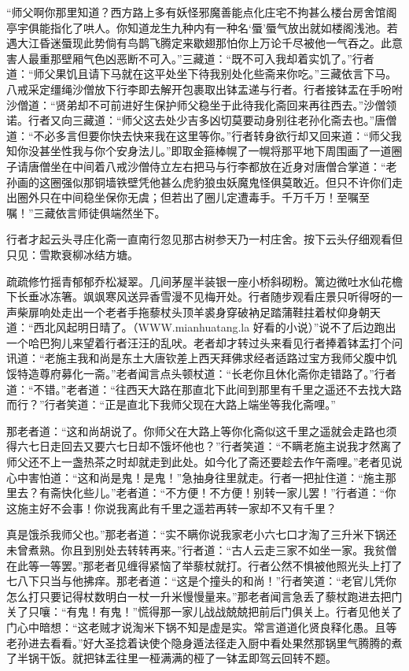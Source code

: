 \documentclass[12pt,UTF8]{ctexbook}
\begin{document}
“师父啊你那里知道？西方路上多有妖怪邪魔善能点化庄宅不拘甚么楼台房舍馆阁亭宇俱能指化了哄人。你知道龙生九种内有一种名‘蜃’蜃气放出就如楼阁浅池。若遇大江昏迷蜃现此势倘有鸟鹊飞腾定来歇翅那怕你上万论千尽被他一气吞之。此意害人最重那壁厢气色凶恶断不可入。”三藏道：“既不可入我却着实饥了。”行者道：“师父果饥且请下马就在这平处坐下待我别处化些斋来你吃。”三藏依言下马。八戒采定缰绳沙僧放下行李即去解开包裹取出钵盂递与行者。行者接钵盂在手吩咐沙僧道：“贤弟却不可前进好生保护师父稳坐于此待我化斋回来再往西去。”沙僧领诺。行者又向三藏道：“师父这去处少吉多凶切莫要动身别往老孙化斋去也。”唐僧道：“不必多言但要你快去快来我在这里等你。”行者转身欲行却又回来道：“师父我知你没甚坐性我与你个安身法儿。”即取金箍棒幌了一幌将那平地下周围画了一道圈子请唐僧坐在中间着八戒沙僧侍立左右把马与行李都放在近身对唐僧合掌道：“老孙画的这圈强似那铜墙铁壁凭他甚么虎豹狼虫妖魔鬼怪俱莫敢近。但只不许你们走出圈外只在中间稳坐保你无虞；但若出了圈儿定遭毒手。千万千万！至嘱至嘱！”三藏依言师徒俱端然坐下。

行者才起云头寻庄化斋一直南行忽见那古树参天乃一村庄舍。按下云头仔细观看但只见：雪欺衰柳冰结方塘。

疏疏修竹摇青郁郁乔松凝翠。几间茅屋半装银一座小桥斜砌粉。篱边微吐水仙花檐下长垂冰冻箸。飒飒寒风送异香雪漫不见梅开处。行者随步观看庄景只听得呀的一声柴扉响处走出一个老者手拖藜杖头顶羊裘身穿破衲足踏蒲鞋拄着杖仰身朝天道：“西北风起明日晴了。（WWW.mianhuatang.la 好看的小说）”说不了后边跑出一个哈巴狗儿来望着行者汪汪的乱吠。老者却才转过头来看见行者捧着钵盂打个问讯道：“老施主我和尚是东土大唐钦差上西天拜佛求经者适路过宝方我师父腹中饥馁特造尊府募化一斋。”老者闻言点头顿杖道：“长老你且休化斋你走错路了。”行者道：“不错。”老者道：“往西天大路在那直北下此间到那里有千里之遥还不去找大路而行？”行者笑道：“正是直北下我师父现在大路上端坐等我化斋哩。”

那老者道：“这和尚胡说了。你师父在大路上等你化斋似这千里之遥就会走路也须得六七日走回去又要六七日却不饿坏他也？”行者笑道：“不瞒老施主说我才然离了师父还不上一盏热茶之时却就走到此处。如今化了斋还要趁去作午斋哩。”老者见说心中害怕道：“这和尚是鬼！是鬼！”急抽身往里就走。行者一把扯住道：“施主那里去？有斋快化些儿。”老者道：“不方便！不方便！别转一家儿罢！”行者道：“你这施主好不会事！你说我离此有千里之遥若再转一家却不又有千里？

真是饿杀我师父也。”那老者道：“实不瞒你说我家老小六七口才淘了三升米下锅还未曾煮熟。你且到别处去转转再来。”行者道：“古人云走三家不如坐一家。我贫僧在此等一等罢。”那老者见缠得紧恼了举藜杖就打。行者公然不惧被他照光头上打了七八下只当与他拂痒。那老者道：“这是个撞头的和尚！”行者笑道：“老官儿凭你怎么打只要记得杖数明白一杖一升米慢慢量来。”那老者闻言急丢了藜杖跑进去把门关了只嚷：“有鬼！有鬼！”慌得那一家儿战战兢兢把前后门俱关上。行者见他关了门心中暗想：“这老贼才说淘米下锅不知是虚是实。常言道道化贤良释化愚。且等老孙进去看看。”好大圣捻着诀使个隐身遁法径走入厨中看处果然那锅里气腾腾的煮了半锅干饭。就把钵盂往里一桠满满的桠了一钵盂即驾云回转不题。
\end{document}
